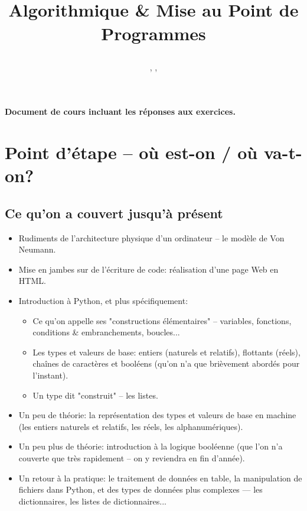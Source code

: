 \documentclass[12pt]{article}
\title
	{\vspace{3cm}
		{\Large
		\textit
			{
				\classe\hspace{0.1cm}
				\textemdash\
				\hspace{0.1cm}
				\themecours
			}
			
		\vspace{1cm}
		\huge{Algorithmique \& Mise au Point de Programmes} }
		 
		\vspace{1cm}
	}
\author{\etablissement}
\date{
	\auteur,
	\datedoc,
	\footnotesize{\textit{\versiondoc}} 
	\vspace{2cm}
	}
\begin{document}
	
	\maketitle
	\thispagestyle{empty}
		
	\section*{}
		{\noindent
		\resumecours
		}
	
	\vspace{2cm}
	\begin{MaReponse}
		\centering
		\vspace{\baselineskip}
		\textbf{Document de cours incluant les réponses aux exercices.}
		\vspace{\baselineskip}
	\end{MaReponse}
		
	\pagebreak	
	\tableofcontents
	
	\pagebreak
	

	\section{Point d'étape -- où est-on / où va-t-on?}
	\subsection{Ce qu'on a couvert jusqu'à présent}
	
	\begin{itemize}
		\item Rudiments de l'architecture physique d'un ordinateur -- le modèle de Von Neumann.
		\item Mise en jambes sur de l'écriture de code: réalisation d'une page Web en HTML.
		\item Introduction à Python, et plus spécifiquement:
		\begin{itemize}
			\item Ce qu'on appelle ses "constructions élémentaires" -- variables, fonctions, conditions \& embranchements, boucles...
			\item Les types et valeurs de base: entiers (naturels et relatifs), flottants (réels), chaînes de caractères et booléens (qu'on n'a que brièvement abordés pour l'instant).
			\item Un type dit "construit" -- les listes.
		\end{itemize}
		\item Un peu de théorie: la représentation des types et valeurs de base en machine (les entiers naturels et relatifs, les réels, les alphanumériques).
		\item Un peu plus de théorie: introduction à la logique booléenne (que l'on n'a couverte que très rapidement -- on y reviendra en fin d'année).
		\item Un retour à la pratique: le traitement de données en table, la manipulation de fichiers dans Python, et des types de données plus complexes --- les dictionnaires, les listes de dictionnaires...
	\end{itemize}
	
\end{document}
